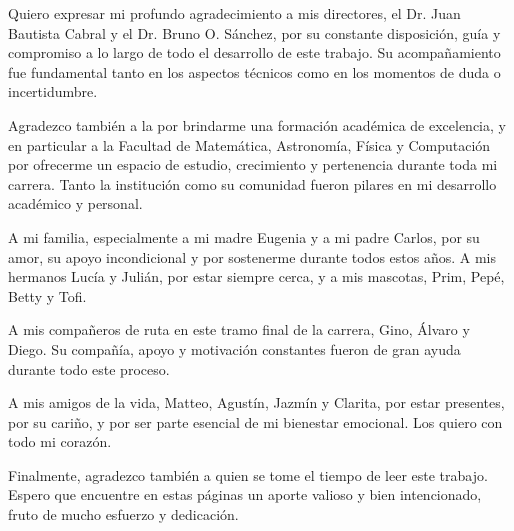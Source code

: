 Quiero expresar mi profundo agradecimiento a mis directores, el Dr. Juan Bautista Cabral y el Dr. Bruno O. Sánchez, por su constante disposición, guía y compromiso a lo largo de todo el desarrollo de este trabajo. Su acompañamiento fue fundamental tanto en los aspectos técnicos como en los momentos de duda o incertidumbre.

Agradezco también a la \unc{} por brindarme una formación académica de excelencia, y en particular a la Facultad de Matemática, Astronomía, Física y Computación por ofrecerme un espacio de estudio, crecimiento y pertenencia durante toda mi carrera. Tanto la institución como su comunidad fueron pilares en mi desarrollo académico y personal.

A mi familia, especialmente a mi madre Eugenia y a mi padre Carlos, por su amor, su apoyo incondicional y por sostenerme durante todos estos años. A mis hermanos Lucía y Julián, por estar siempre cerca, y a mis mascotas, Prim, Pepé, Betty y Tofi.

A mis compañeros de ruta en este tramo final de la carrera, Gino, Álvaro y Diego. Su compañía, apoyo y motivación constantes fueron de gran ayuda durante todo este proceso.

A mis amigos de la vida, Matteo, Agustín, Jazmín y Clarita, por estar presentes, por su cariño, y por ser parte esencial de mi bienestar emocional. Los quiero con todo mi corazón.

Finalmente, agradezco también a quien se tome el tiempo de leer este trabajo. Espero que encuentre en estas páginas un aporte valioso y bien intencionado, fruto de mucho esfuerzo y dedicación.
